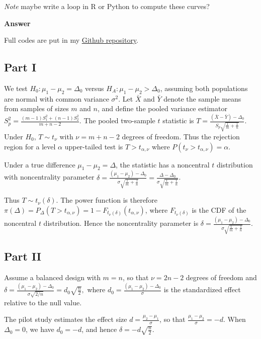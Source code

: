\documentclass[letterpaper]{article}
\begin{document}
	\medskip
	
	\emph{Note} maybe write a loop in R or Python to compute these curves?
	
	\textbf{Answer}
	
	Full codes are put in my \href{https://github.com/zongyiliu/STAT_5291/tree/main/Homework/Homework_2}{Github repository}.
	
	\subsection{Part I}
	
	We test
	$H_0:\mu_1-\mu_2=\Delta_0$
	versus
	$H_A:\mu_1-\mu_2>\Delta_0$,
	assuming both populations are normal with common variance $\sigma^2$. Let $\bar X$ and $\bar Y$ denote the sample means from samples of sizes
	$m$ and $n$, and define the pooled variance estimator
	$S_p^2=\frac{(m-1)S_1^2+(n-1)S_2^2}{m+n-2}$. The pooled two-sample $t$ statistic is
	$T=\frac{(\bar X-\bar Y)-\Delta_0}{S_p\sqrt{\frac1m+\frac1n}}$. Under $H_0$, $T\sim t_\nu$ with $\nu=m+n-2$ degrees of freedom.  
	Thus the rejection region for a level $\alpha$ upper-tailed test is
	$T>t_{\alpha,\nu}$ where $P(t_\nu>t_{\alpha,\nu})=\alpha$.
	
	Under a true difference $\mu_1-\mu_2=\Delta$, the statistic has a
	noncentral $t$ distribution with noncentrality parameter $\delta=\frac{(\mu_1-\mu_2)-\Delta_0}{\sigma\sqrt{\frac1m+\frac1n}}
	=\frac{\Delta-\Delta_0}{\sigma\sqrt{\frac1m+\frac1n}}$.
	
	Thus $T\sim t_\nu(\delta)$. The power function is therefore $\pi(\Delta)
	=P_\Delta(T>t_{\alpha,\nu})
	=1-F_{t_\nu(\delta)}(t_{\alpha,\nu})$, where $F_{t_\nu(\delta)}$ is the CDF of the noncentral $t$ distribution. Hence the noncentrality parameter is ${\delta=\frac{(\mu_1-\mu_2)-\Delta_0}{\sigma\sqrt{\frac1m+\frac1n}}}$.
	
	\clearpage
	
	\subsection{Part II}
	
	
	Assume a balanced design with $m=n$, so that $\nu=2n-2$ degrees of freedom and
	$\delta=\frac{(\mu_1-\mu_2)-\Delta_0}{\sigma\sqrt{2/n}}=d_0\sqrt{\frac{n}{2}},$
	where $d_0=\frac{(\mu_1-\mu_2)-\Delta_0}{\sigma}$ is the standardized effect relative to the null value.
	
	The pilot study estimates the effect size $d=\frac{\mu_2-\mu_1}{\sigma}$, so that $\frac{\mu_1-\mu_2}{\sigma}=-d$. When $\Delta_0=0$, we have $d_0=-d$, and hence
	$\delta = -d\sqrt{\frac{n}{2}}.$
	
\end{document}
